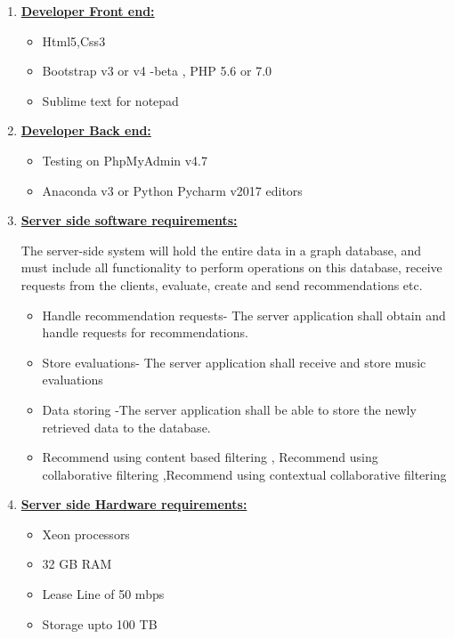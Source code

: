 \documentclass[a4paper,12pt]{report}
\begin{document}
\begin{enumerate}
    \item \textbf{\underline{Developer Front end:}}
        \begin{itemize}
            \item Html5,Css3
            \item Bootstrap v3 or v4 -beta , PHP 5.6 or 7.0
            \item Sublime text for notepad
        \end{itemize}

    \item \textbf{\underline{Developer Back end:}}
        \begin{itemize}
            \item Testing on PhpMyAdmin v4.7
            \item Anaconda v3 or Python Pycharm v2017 editors
        \end{itemize}


    \item \textbf{\underline{Server side software requirements:}}
    \par The server-side system will hold the entire data in a graph database, and must include all functionality to perform operations on this database, receive requests from the clients, evaluate, create and send recommendations etc.
        \begin{itemize}
            \item Handle recommendation requests- The server application shall obtain and handle requests for recommendations.
            \item Store evaluations- The server application shall receive and store music evaluations
            \item  Data storing -The server application shall be able to store the newly retrieved data to the database.
            \item Recommend using content based filtering , Recommend using collaborative filtering ,Recommend using contextual collaborative filtering
        \end{itemize}

    \item \textbf{\underline{Server side Hardware requirements:}}
        \begin{itemize}
            \item Xeon processors
            \item 32 GB RAM
            \item Lease Line of 50 mbps
            \item Storage upto 100 TB
        \end{itemize}


\end{enumerate}
\end{document}
